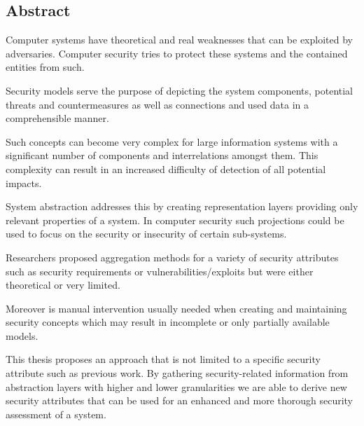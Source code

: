 \subsection*{Abstract}
\pagestyle{empty}

Computer systems have theoretical and real weaknesses that can be exploited by adversaries. Computer security tries to protect these systems and the contained entities from such.

Security models serve the purpose of depicting the system components, potential threats and countermeasures as well as connections and used data in a comprehensible manner. 

Such concepts can become very complex for large information systems with a significant number of components and interrelations amongst them. This complexity can result in an increased difficulty of detection of all potential impacts.

System abstraction addresses this by creating representation layers providing only relevant properties of a system. In computer security such projections could be used to focus on the security or insecurity of certain sub-systems.

Researchers proposed aggregation methods for a variety of security attributes such as security requirements or vulnerabilities/exploits  but were either theoretical or very limited. 

Moreover is manual intervention usually needed  when creating and maintaining security concepts  which may result in incomplete or only partially available models.

This thesis proposes an approach that is not limited to a specific security attribute such as previous work. By gathering security-related information from abstraction layers with higher and lower granularities we are able to derive new security attributes that can be used for an enhanced and more thorough security assessment of a system. 
